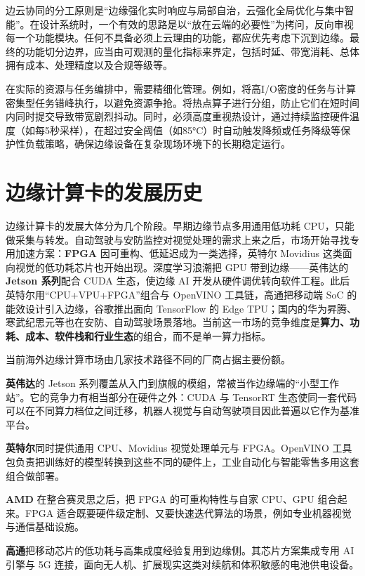 边云协同的分工原则是``边缘强化实时响应与局部自治，云强化全局优化与集中智能''。在设计系统时，一个有效的思路是以``放在云端的必要性''为拷问，反向审视每一个功能模块。任何不具备必须上云理由的功能，都应优先考虑下沉到边缘。最终的功能切分边界，应当由可观测的量化指标来界定，包括时延、带宽消耗、总体拥有成本、处理精度以及合规等级等。

在实际的资源与任务编排中，需要精细化管理。例如，将高I/O密度的任务与计算密集型任务错峰执行，以避免资源争抢。将热点算子进行分组，防止它们在短时间内同时提交导致带宽剧烈抖动。同时，必须高度重视热设计，通过持续监控硬件温度（如每5秒采样），在超过安全阈值（如85°C）时自动触发降频或任务降级等保护性负载策略，确保边缘设备在复杂现场环境下的长期稳定运行。

\section{边缘计算卡的发展历史}\label{src-book-chapter1-h6}

边缘计算卡的发展大体分为几个阶段。早期边缘节点多用通用低功耗
CPU，只能做采集与转发。自动驾驶与安防监控对视觉处理的需求上来之后，市场开始寻找专用加速方案：\textbf{FPGA}
因可重构、低延迟成为一类选择，英特尔 Movidius
这类面向视觉的低功耗芯片也开始出现。深度学习浪潮把 GPU
带到边缘------英伟达的 \textbf{Jetson 系列}配合 CUDA 生态，使边缘 AI
开发从硬件调优转向软件工程。此后英特尔用``CPU+VPU+FPGA''组合与 OpenVINO
工具链，高通把移动端 SoC 的能效设计引入边缘，谷歌推出面向 TensorFlow 的
Edge
TPU；国内的华为昇腾、寒武纪思元等也在安防、自动驾驶场景落地。当前这一市场的竞争维度是\textbf{算力、功耗、成本、软件栈和行业生态}的组合，而不是单一算力指标。

当前海外边缘计算市场由几家技术路径不同的厂商占据主要份额。

\textbf{英伟达}的 Jetson
系列覆盖从入门到旗舰的模组，常被当作边缘端的``小型工作站''。它的竞争力有相当部分在硬件之外：CUDA
与 TensorRT
生态使同一套代码可以在不同算力档位之间迁移，机器人视觉与自动驾驶项目因此普遍以它作为基准平台。

\textbf{英特尔}同时提供通用 CPU、Movidius 视觉处理单元与 FPGA。OpenVINO
工具包负责把训练好的模型转换到这些不同的硬件上，工业自动化与智能零售多用这套组合做部署。

\textbf{AMD} 在整合赛灵思之后，把 FPGA 的可重构特性与自家 CPU、GPU
组合起来。FPGA
适合既要硬件级定制、又要快速迭代算法的场景，例如专业机器视觉与通信基础设施。

\textbf{高通}把移动芯片的低功耗与高集成度经验复用到边缘侧。其芯片方案集成专用
AI 引擎与 5G
连接，面向无人机、扩展现实这类对续航和体积敏感的电池供电设备。

